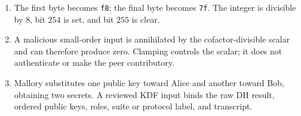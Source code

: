 \begin{enumerate}
  \item The first byte becomes \texttt{f8}; the final byte becomes
        \texttt{7f}. The integer is divisible by $8$, bit $254$ is set, and
        bit $255$ is clear.

  \item A malicious small-order input is annihilated by the cofactor-divisible
        scalar and can therefore produce zero. Clamping controls the scalar; it
        does not authenticate or make the peer contributory.

  \item Mallory substitutes one public key toward Alice and another toward
        Bob, obtaining two secrets. A reviewed KDF input binds the raw DH result,
        ordered public keys, roles, suite or protocol label, and transcript.
\end{enumerate}
